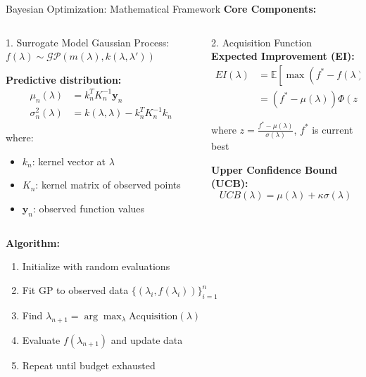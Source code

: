 \documentclass[8pt,aspectratio=1610]{beamer}
\begin{document}
\begin{frame}{Bayesian Optimization: Mathematical Framework}
\textbf{Core Components:}

\begin{columns}[t]
\begin{column}{0.48\textwidth}
\begin{block}{1. Surrogate Model}
Gaussian Process: $f(\lambda) \sim \mathcal{GP}(m(\lambda), k(\lambda, \lambda'))$

\textbf{Predictive distribution:}
\begin{align}
\mu_n(\lambda) &= k_n^T K_n^{-1} \mathbf{y}_n \\
\sigma_n^2(\lambda) &= k(\lambda, \lambda) - k_n^T K_n^{-1} k_n
\end{align}

where:
\begin{itemize}
\item $k_n$: kernel vector at $\lambda$
\item $K_n$: kernel matrix of observed points
\item $\mathbf{y}_n$: observed function values
\end{itemize}
\end{block}
\end{column}

\begin{column}{0.48\textwidth}
\begin{block}{2. Acquisition Function}
\textbf{Expected Improvement (EI):}
\begin{align}
EI(\lambda) &= \mathbb{E}[\max(f^* - f(\lambda), 0)] \\
&= (f^* - \mu(\lambda))\Phi(z) + \sigma(\lambda)\phi(z)
\end{align}

where $z = \frac{f^* - \mu(\lambda)}{\sigma(\lambda)}$, $f^*$ is current best

\textbf{Upper Confidence Bound (UCB):}
$$UCB(\lambda) = \mu(\lambda) + \kappa \sigma(\lambda)$$
\end{block}
\end{column}
\end{columns}

\vspace{0.3cm}

\textbf{Algorithm:}
\begin{enumerate}
\item Initialize with random evaluations
\item Fit GP to observed data $\{(\lambda_i, f(\lambda_i))\}_{i=1}^n$
\item Find $\lambda_{n+1} = \arg\max_\lambda \text{Acquisition}(\lambda)$
\item Evaluate $f(\lambda_{n+1})$ and update data
\item Repeat until budget exhausted
\end{enumerate}
\end{frame}
\end{document}
